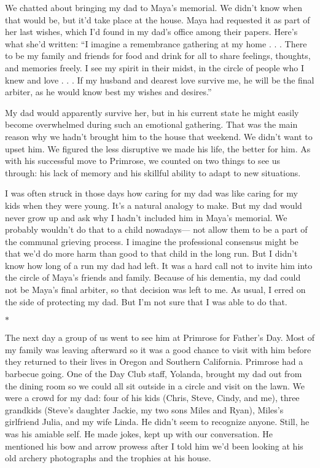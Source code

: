 \documentclass[12pt]{book}
\begin{document}
We chatted about bringing my dad to Maya's memorial. We didn't know when that would be, but it'd take place at the house. Maya had requested it as part of her last wishes, which I'd found in my dad's office among their papers. Here's what she'd written: ``I imagine a remembrance gathering at my home . . . There to be my family and friends for food and drink for all to share feelings, thoughts, and memories freely. I see my spirit in their midst, in the circle of people who I knew and love . . . If my husband and dearest love survive me, he will be the final arbiter, as he would know best my wishes and desires.''

My dad would apparently survive her, but in his current state he might easily become overwhelmed during such an emotional gathering. That was the main reason why we hadn't brought him to the house that weekend. We didn't want to upset him. We figured the less disruptive we made his life, the better for him. As with his successful move to Primrose, we counted on two things to see us through: his lack of memory and his skillful ability to adapt to new situations.

I was often struck in those days how caring for my dad was like caring for my kids when they were young. It's a natural analogy to make. But my dad would never grow up and ask why I hadn't included him in Maya's memorial. We probably wouldn't do that to a child nowadays--- not allow them to be a part of the communal grieving process. I imagine the professional consensus might be that we'd do more harm than good to that child in the long run. But I didn't know how long of a run my dad had left. It was a hard call not to invite him into the circle of Maya's friends and family. Because of his dementia, my dad could not be Maya's final arbiter, so that decision was left to me. As usual, I erred on the side of protecting my dad. But I'm not sure that I was able to do that.

\begin{center}$*$\end{center}

The next day a group of us went to see him at Primrose for Father's Day. Most of my family was leaving afterward so it was a good chance to visit with him before they returned to their lives in Oregon and Southern California. Primrose had a barbecue going. One of the Day Club staff, Yolanda, brought my dad out from the dining room so we could all sit outside in a circle and visit on the lawn. We were a crowd for my dad: four of his kids (Chris, Steve, Cindy, and me), three grandkids (Steve's daughter Jackie, my two sons Miles and Ryan), Miles's girlfriend Julia, and my wife Linda. He didn't seem to recognize anyone. Still, he was his amiable self. He made jokes, kept up with our conversation. He mentioned his bow and arrow prowess after I told him we'd been looking at his old archery photographs and the trophies at his house.
\end{document}
